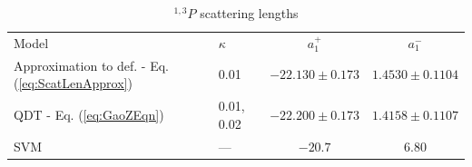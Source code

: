 \documentclass[preprint,showpacs,showkeys,preprintnumbers,amsmath,amssymb,longbibliography,pra,aps]{revtex4-1}
\begin{document}
{\begin{table}[H]
\begin{center}
\begin{ruledtabular}
\begin{tabular}{l l c c}
Model & $\kappa$ & $a_1^+$ & $a_1^-$ \\
\colrule
Approximation to def. - Eq. (\ref{eq:ScatLenApprox}) & 0.01 & $-22.130 \pm 0.173$ & $1.4530 \pm 0.1104$ \\
QDT - Eq. (\ref{eq:GaoZEqn}) & 0.01, 0.02 & $-22.200 \pm 0.173$ & $1.4158 \pm 0.1107$ \\
\colrule
SVM \cite{Ivanov2002} & --- & $-20.7$ & $6.80$ 
\end{tabular}
\end{ruledtabular}
\caption{$^{1,3}P$ scattering lengths}
\label{tab:PWaveScatLen}
\end{center}
\end{table}


}
\end{document}
